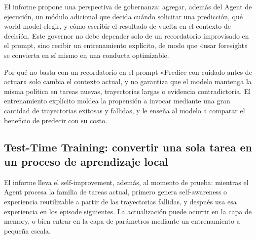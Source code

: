 El informe propone una perspectiva de gobernanza: agregar, además del Agent de ejecución, un módulo adicional que decida cuándo solicitar una predicción, qué world model elegir, y cómo escribir el resultado de vuelta en el contexto de decisión. Este governor no debe depender solo de un recordatorio improvisado en el prompt, sino recibir un entrenamiento explícito, de modo que «usar foresight» se convierta en sí mismo en una conducta optimizable.



\begin{knowledgebox}{Por qué no basta con un recordatorio en el prompt}
«Predice con cuidado antes de actuar» solo cambia el contexto actual, y no garantiza que el modelo mantenga la misma política en tareas nuevas, trayectorias largas o evidencia contradictoria. El entrenamiento explícito moldea la propensión a invocar mediante una gran cantidad de trayectorias exitosas y fallidas, y le enseña al modelo a comparar el beneficio de predecir con su costo.
\end{knowledgebox}

\subsection{Test-Time Training: convertir una sola tarea en un proceso de aprendizaje local}

El informe lleva el self-improvement, además, al momento de prueba: mientras el Agent procesa la familia de tareas actual, primero genera self-awareness o experiencia reutilizable a partir de las trayectorias fallidas, y después usa esa experiencia en los episode siguientes. La actualización puede ocurrir en la capa de memory, o bien entrar en la capa de parámetros mediante un entrenamiento a pequeña escala.



